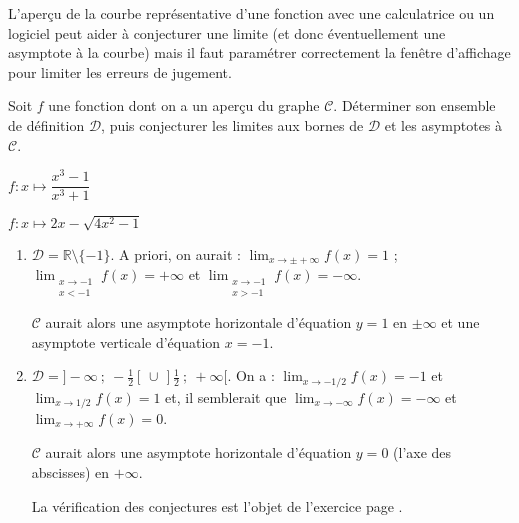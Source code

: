 \begin{methode*1}
L'aperçu de la courbe représentative d'une fonction avec une  calculatrice ou un logiciel peut aider à conjecturer une limite (et donc éventuellement une asymptote  à la courbe) mais il faut paramétrer correctement la fenêtre d'affichage pour limiter les erreurs de jugement.

  \exercice \label{test_boite_methode}
Soit $f$ une fonction dont on a un aperçu du graphe $\mathscr{C}$. Déterminer son ensemble de définition $\mathcal{D}$, puis conjecturer les limites aux bornes de $\mathcal{D}$ et les  asymptotes à $\mathscr{C}$.
\begin{colenumerate}{2}
\item $f:x\mapsto \dfrac{x^3-1}{x^3+1}$\par\vspace{1mm}
  
\item $f:x\mapsto 2x-\sqrt{4x^2-1}$ \par\vspace{1mm}
 \end{colenumerate}

  \correction

  \vspace{-3mm}

  \begin{enumerate}
  \item  $\mathcal{D}=\mathbb{R}\setminus\{-1\}$. A priori, on aurait : $\displaystyle\lim_{x\to\pm+\infty}f(x)=1$ ; $\displaystyle\lim_{\substack{x\to -1\\ x<-1}}f(x)=+\infty$ et $\displaystyle\lim_{\substack{x\to -1\\ x>-1}}f(x)=-\infty$.\par
        $\mathscr{C}$ aurait alors une asymptote  horizontale d'équation $y=1$ en $\pm\infty$ et une asymptote verticale d'équation $x=-1$.
  \item  $\mathcal{D}=]-\infty~;~-\tfrac{1}{2}[\,\cup\,]\tfrac{1}{2}~;~+\infty[$. On a : $\displaystyle\lim_{x\to -1/2}f(x)=-1$ et $\displaystyle\lim_{x\to 1/2}f(x)=1$ et, il semblerait que $\displaystyle\lim_{x\to-\infty}f(x)=-\infty$ et $\displaystyle\lim_{x\to +\infty}f(x)=0$.\par
        $\mathscr{C}$ aurait alors une asymptote horizontale d'équation $y=0$ (l'axe des abscisses) en $+\infty$.\par
         La vérification des conjectures est l'objet de l'exercice  page \pageref{suite_methode1}.
  \end{enumerate}
  \vspace{-10mm}
\end{methode*1}

\vspace{-5mm}
